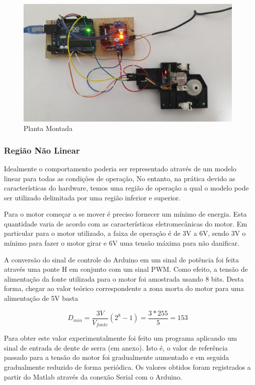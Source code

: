 \documentclass[a4paper,11pt]{article}
\begin{document}
\begin{figure}[H]
    \centering
    \includegraphics[width=\linewidth]{src/tex/img/full_system.jpg}
    \caption{Planta Montada}
    \label{fig:pid_tinkercad}
\end{figure}

\subsubsection{Região Não Linear}

Idealmente o comportamento poderia ser representado através de um modelo linear para todas as condições de operação, No entanto, na prática devido as características do hardware, temos uma região de operação a qual o modelo pode ser utilizado delimitada por uma região inferior e superior.

Para o motor começar a se mover é preciso fornecer um mínimo de energia. Esta quantidade varia de acordo com as características eletromecânicas do motor. Em particular para o motor utilizado, a faixa de operação é de 3V a 6V, sendo 3V o mínimo para fazer o motor girar e 6V uma tensão máxima para não danificar.

A conversão do sinal de controle do Arduino em um sinal de potência foi feita através uma ponte H em conjunto com um sinal PWM. Como efeito, a tensão de alimentação da fonte utilizada para o motor foi amostrada usando 8 bits. Desta forma, chegar ao valor teórico correspondente a zona morta do motor para uma alimentação de 5V basta 

$$
D_{min} = \frac{3V}{V_{fonte}}(2^8 -1) = \frac{3*255}{5} = 153
$$

Para obter este valor experimentalmente foi feito um programa aplicando um sinal de entrada de dente de serra (em anexo). Isto é, o valor de referência passado para a tensão do motor foi gradualmente aumentado e em seguida gradualmente reduzido de forma periódica. Os valores obtidos foram registrados a partir do Matlab através da conexão Serial com o Arduino.
\end{document}
